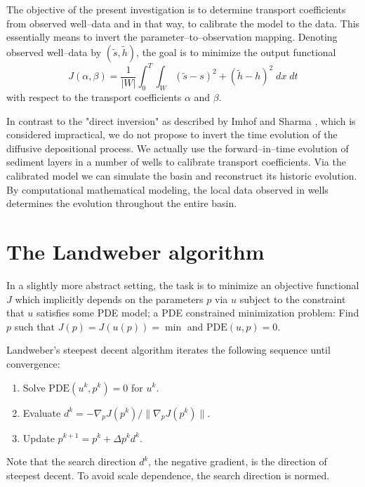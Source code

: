 The objective of the present investigation is to
determine transport coefficients from observed well--data
and in that way, to calibrate the model to the data.
This essentially means to invert the parameter--to--observation mapping.
Denoting observed well--data by $(\widetilde s,\widetilde h)$,
the goal is to minimize the output functional
\begin{equation} \label{output}
 J(\alpha, \beta) =
 \frac{1}{|W|} \int_0^T \int_W (\widetilde s - s)^2 + (\widetilde h - h)^2 \; dx \; dt
\end{equation}
with respect to the transport coefficients $\alpha$ and $\beta$.

In contrast to the "direct inversion" as described by Imhof and Sharma \cite{ImhofSharma2007},
which is considered impractical,
we do not propose to invert the time evolution of the diffusive depositional process.
We actually use the forward--in--time evolution of sediment layers in a number of wells
to calibrate transport coefficients.
Via the calibrated model we can simulate the basin and reconstruct its historic evolution.
By computational mathematical modeling,
the local data observed in wells determines the evolution throughout the entire basin.

\section{The Landweber algorithm}

In a slightly more abstract setting,
the task is to minimize an objective functional $J$
which implicitly depends on the parameters $p$ via $u$
subject to the constraint that $u$ satisfies some PDE model;
a PDE constrained minimization problem:
Find $p$ such that $J(p)=J(u(p))=\min$ and $\mathrm{PDE}(u,p)=0$.
\goodbreak

Landweber's steepest decent algorithm \cite{Landweber51} iterates the following sequence until convergence:
\goodbreak

\begin{enumerate}
\item Solve $\mathrm{PDE}(u^k,p^k)=0$ for $u^k$.
\item Evaluate $d^k=-\nabla_pJ(p^k) / \| \nabla_pJ(p^k) \|$.
\item Update $p^{k+1}=p^k+\Delta p^k d^k$.
\end{enumerate}
\goodbreak

Note that the search direction $d^k$, the negative gradient, is the direction of steepest decent.
To avoid scale dependence, the search direction is normed.

